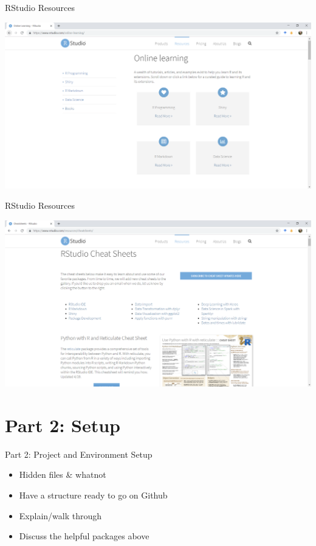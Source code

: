 \documentclass[ignorenonframetext,]{beamer}
\providecommand{\tightlist}{%
  \setlength{\itemsep}{0pt}\setlength{\parskip}{0pt}}
\begin{document}
\begin{frame}{RStudio Resources}
\protect\hypertarget{rstudio-resources-1}{}

\includegraphics{../external/images/rstudio_dot_com_2_learning.PNG}

\end{frame}

\begin{frame}{RStudio Resources}
\protect\hypertarget{rstudio-resources-2}{}

\includegraphics{../external/images/rstudio_dot_com_3_cheats.PNG}

\end{frame}

\hypertarget{part-2-setup}{%
\section{Part 2: Setup}\label{part-2-setup}}

\begin{frame}{Part 2: Project and Environment Setup}
\protect\hypertarget{part-2-project-and-environment-setup}{}

\begin{itemize}
\tightlist
\item
  Hidden files \& whatnot
\item
  Have a structure ready to go on Github
\item
  Explain/walk through
\item
  Discuss the helpful packages above
\end{itemize}

\end{frame}
\end{document}
